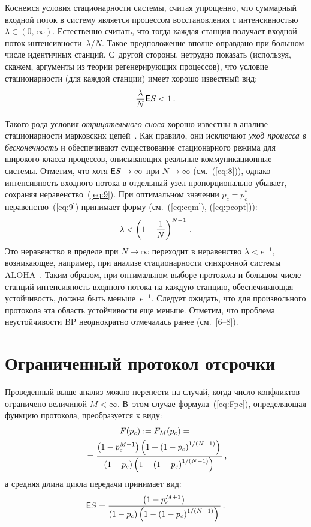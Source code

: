 \begin{multicols}{2}
Коснемся условия стационарности системы, считая
упрощенно, что суммарный входной поток в систему является процессом
восстановления с интенсивностью $\lambda \in (0,\,\infty)$.
Естественно считать, что тогда каждая станция получает входной поток
интенсивности~$\lambda/N$. Такое  предположение вполне оправдано при
большом числе идентичных станций. С~другой стороны, нетрудно
показать (используя, скажем,  аргументы из теории регенерирующих процессов), что  условие стационарности (для каждой
станции) имеет хорошо известный вид:
\begin{equation}
\displaystyle\frac{\displaystyle \lambda\mathstrut}{\displaystyle N\mathstrut}{\sf E} S< 1\,. 
\label{eq:9}
\end{equation}

Такого рода условия {\it отрицательного сноса} хорошо известны в
анализе стационарности марковских цепей~\cite {MEYN}. Как правило,
они исключают {\it уход процесса в бесконечность} и
обеспечивают существование стационарного режима для широкого класса
процессов, описывающих реальные коммуникационные системы. Отметим,
что хотя ${\sf E} S\to \infty$ при $N\to \infty$ (см.~(\ref{eq:8})),
однако интенсивность входного потока в отдельный узел
пропорционально убывает, сохраняя неравенство~(\ref{eq:9}). При
оптимальном значении $p_c=p_c^*$ неравенство~(\ref{eq:9}) принимает
форму (см.~(\ref{eq:eqm}), (\ref{eq:pcopt})):
\begin{equation*}
\lambda<\left(1-\displaystyle\frac{\displaystyle 1\mathstrut}{\displaystyle N\mathstrut}\right)^{N-1}\,.
\end{equation*}
 Это неравенство в пределе  при  $N\to \infty$ переходит в
 неравенство $ \lambda<e^{-1}, $ возникающее, например,  при анализе
 стационарности   синхронной  системы ALOHA~\cite{ROBERTS, Kleinrock}.
 Таким образом,  при
оптимальном выборе протокола и большом числе станций интенсивность
входного потока на каждую станцию, обеспечивающая устойчивость,
должна быть меньше~$e^{-1}$. Следует ожидать, что для произвольного
протокола эта область устойчивости еще меньше.  Отметим, что
проблема неустойчивости BP неоднократно отмечалась  ранее (см.~[6--8]).

\section{Ограниченный протокол отсрочки}

Проведенный выше анализ можно перенести   на случай, когда число
конфликтов ограничено величиной  $M<\infty$. В~этом случае формула~(\ref{eq:Fpc}), 
определяющая функцию протокола, преобразуется к виду:
\begin{multline}
  F(p_c):= F_M(p_c)={}\\
  {}=\displaystyle\frac{\displaystyle \left(1-p_c^{M+1}\right)\left(1+\left(1-p_c\right)^{1/(N-1)}\right)\mathstrut}{\displaystyle \left(1-p_c\right)\left(1-\left(1-p_c\right)^{1/(N-1)}\right)\mathstrut}\,, 
   \label{eq2:FMpc}
\end{multline}
а средняя длина цикла передачи принимает вид:
\begin{equation*}
   {\sf E} S = \displaystyle\frac{\displaystyle \left(1-p_c^{M+1}\right)\mathstrut}{\displaystyle \left(1-p_c\right)\left(1-\left(1-p_c\right)^{1/(N-1)}\right)\mathstrut}\,. 
\end{equation*}


\end{multicols}
